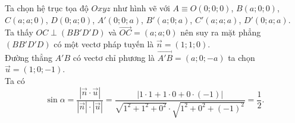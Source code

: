 \begin{ex}
{\begin{center}
		\end{center}
	Ta chọn hệ trục tọa độ $Oxyz$ như hình vẽ với $A \equiv O(0;0;0)$, $B(a;0;0)$, $C(a;a;0)$, $D(0;a;0)$, $A'(0;0;a)$, $B'(a;0;a)$, $C'(a;a;a)$, $D'(0;a;a)$.\\
	Ta thấy $OC \perp\left(BB'D'D\right)$ và $\overrightarrow{OC}=(a;a;0)$ nên suy ra mặt phẳng $\left(BB' D'D\right)$ có một vectơ pháp tuyến là $\vec{n}=(1;1;0)$.\\
	Đường thẳng $A'B$ có vectơ chỉ phương là $\overrightarrow{A'B}=(a;0;-a)$ ta chọn $\vec{u}=(1;0;-1)$.\\
	Ta có  
	$$\sin \alpha=\dfrac{\left| \vec{n} \cdot \vec{u}\right| }{\left| \vec{n}\right|  \cdot\left| \vec{u}\right| }=\dfrac{\left| 1 \cdot 1+1 \cdot 0+0 \cdot(-1)\right| }{\sqrt{1^2+1^2+0^2} \cdot \sqrt{1^2+0^2+(-1)^2}}=\dfrac{1}{2}.$$
	}
\end{ex}
